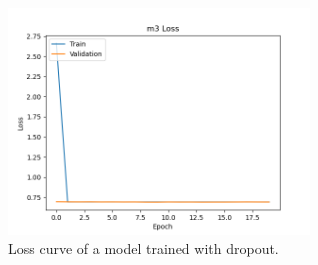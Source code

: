 \documentclass{article}
\begin{document}
\begin{figure}[]
    \centering
    \includegraphics[width=8cm]{dropout}
    \caption{Loss curve of a model trained with dropout.}
    \label{fig:dropout}
\end{figure}

\clearpage
{}

\end{document}
